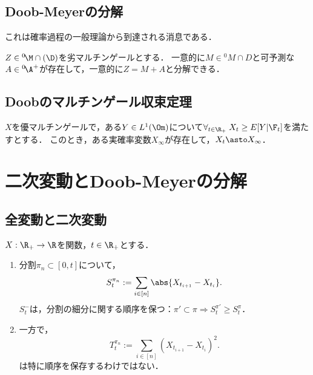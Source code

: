\documentclass[uplatex,dvipdfmx]{jsreport}
\begin{document}
\subsection{Doob-Meyerの分解}

\begin{tcolorbox}[colframe=ForestGreen, colback=ForestGreen!10!white,breakable,colbacktitle=ForestGreen!40!white,coltitle=black,fonttitle=\bfseries\sffamily,
title=]
    これは確率過程の一般理論から到達される消息である．
\end{tcolorbox}

\begin{theorem}
    $Z\in{}^0\!\M\cap(\D)$を劣マルチンゲールとする．
    一意的に$M\in {}^0\!M\cap D$と可予測な$A\in{}^0\!\A^+$が存在して，一意的に$Z=M+A$と分解できる．
\end{theorem}

\subsection{Doobのマルチンゲール収束定理}

\begin{theorem}
    $X$を優マルチンゲールで，ある$Y\in L^1(\Om)$について$\forall_{t\in\R_+}\;X_t\ge E[Y|\F_t]$を満たすとする．
    このとき，ある実確率変数$X_\infty$が存在して，$X_t\asto X_\infty$．
\end{theorem}

\section{二次変動とDoob-Meyerの分解}

\subsection{全変動と二次変動}

\begin{notation}
    $X:\R_+\to\R$を関数，$t\in\R_+$とする．
    \begin{enumerate}
        \item 分割$\pi_n\subset[0,t]$について，
        \[S^{\pi_n}_t:=\sum_{i\in[n]}\abs{X_{t_{i+1}}-X_{t_i}}.\]
        $S_t^-$は，分割の細分に関する順序を保つ：$\pi'\subset\pi\Rightarrow S^{\pi'}_t\ge S^{\pi}_t$．
        \item 一方で，
        \[T^{\pi_n}_t:=\sum_{i\in[n]}(X_{t_{i+1}}-X_{t_i})^2.\]
        は特に順序を保存するわけではない．
    \end{enumerate}
\end{notation}
\end{document}
